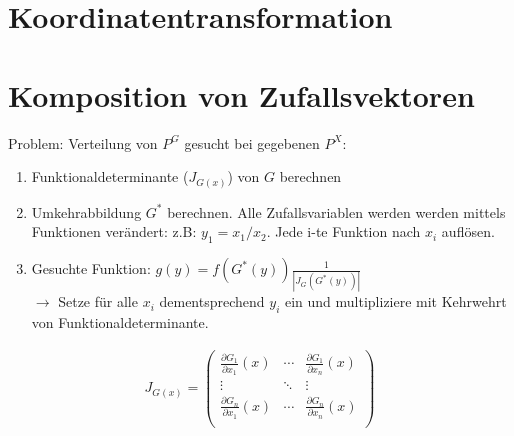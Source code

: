 \documentclass{article}
\begin{document}
\section{Koordinatentransformation}
\section{Komposition von Zufallsvektoren}
\begin{center}
\end{center}
\vspace*{7pt}
Problem: Verteilung von $P^G$ gesucht bei gegebenen $P^X$:
\begin{enumerate}
	\item Funktionaldeterminante ($J_{G(x)}$) von $G$ berechnen
	\item Umkehrabbildung $G^*$ berechnen. Alle Zufallsvariablen werden
		werden mittels Funktionen verändert: z.B: $y_1 = x_1/x_2$.
		Jede i-te Funktion nach $x_i$ auflösen.
	\item Gesuchte Funktion: $g(y) = f(G^*(y))\frac{1}{|J_G(G^*(y))|}$\\
		$\longrightarrow$ Setze für alle $x_i$ dementsprechend $y_i$ ein und multipliziere
		mit Kehrwehrt von Funktionaldeterminante.
\end{enumerate}

\begin{align}
	J_{G(x)} =
	 \begin{pmatrix}
		 \frac{\partial G_1}{\partial x_1} (x) & \cdots & \frac{\partial G_1}{\partial x_n} (x) \\
		   \vdots  & \ddots & \vdots  \\
		 \frac{\partial G_n}{\partial x_1} (x) & \cdots & \frac{\partial G_n}{\partial x_n} (x) \\
		  \end{pmatrix}
\end{align}
\end{document}
